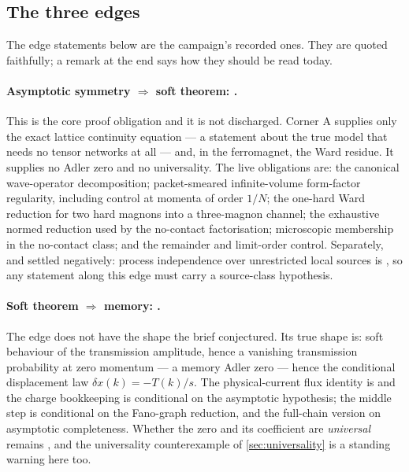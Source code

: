 \subsection{The three edges}

The edge statements below are the campaign's recorded ones. They are quoted
faithfully; a remark at the end says how they should be read today.

\paragraph{Asymptotic symmetry $\Rightarrow$ soft theorem: \statusConjecture.}
This is the core proof obligation and it is not discharged. Corner A supplies
only the exact lattice continuity equation --- a statement about the true
model that needs no tensor networks at all --- and, in the ferromagnet, the
Ward residue. It supplies no Adler zero and no universality. The live
obligations are: the canonical wave-operator decomposition; packet-smeared
infinite-volume form-factor regularity, including control at momenta of order
$1/N$; the one-hard Ward reduction for two hard magnons into a three-magnon
channel; the exhaustive normed reduction used by the no-contact
factorisation; microscopic membership in the no-contact class; and the
remainder and limit-order control. Separately, and settled negatively:
process independence over unrestricted local sources is \statusRefuted{}, so
any statement along this edge must carry a source-class hypothesis.

\paragraph{Soft theorem $\Rightarrow$ memory: \statusSketch.}
The edge does not have the shape the brief conjectured. Its true shape is:
soft behaviour of the transmission amplitude, hence a vanishing transmission
probability at zero momentum --- a memory Adler zero --- hence the conditional
displacement law $\delta x(k)=-T(k)/s$. The physical-current flux identity is
\statusProved{} and the charge bookkeeping is \statusProved{} conditional on
the asymptotic hypothesis; the middle step is conditional on the Fano-graph
reduction, and the full-chain version on asymptotic completeness. Whether the
zero and its coefficient are \emph{universal} remains \statusConjecture{}, and
the universality counterexample of \cref{sec:universality} is a standing
warning here too.

